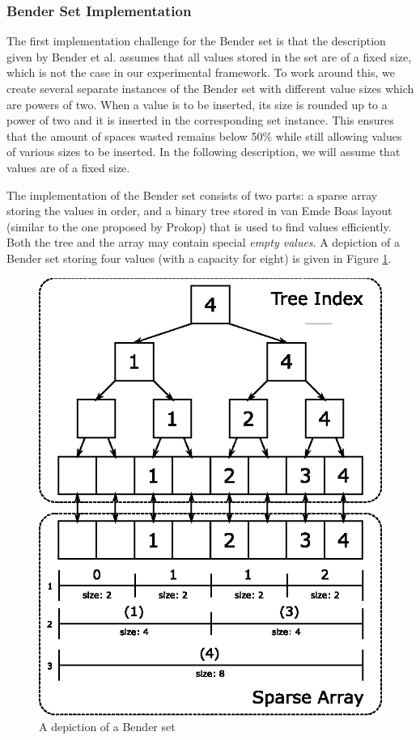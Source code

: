 \documentclass{acm_proc_article-sp}
\begin{document}
\subsubsection{Bender Set Implementation}
The first implementation challenge for the Bender set is that the description
given by Bender et al. assumes that all values stored in the set are of a
fixed size, which is not the case in our experimental framework. To work
around this, we create several separate instances of the Bender set with
different value sizes which are powers of two. When a value is to be inserted,
its size is rounded up to a power of two and it is inserted in the
corresponding set instance. This ensures that the amount of spaces wasted
remains below 50\% while still allowing values of various sizes to be inserted.
In the following description, we will assume that values are of a fixed size.

The implementation of the Bender set consists of two parts: a sparse array
storing the values in order, and a binary tree stored in van Emde Boas
layout (similar to the one proposed by Prokop) that is used to find values
efficiently.
Both the tree and the array may contain special \emph{empty values}.
A depiction of a Bender set storing four values (with a capacity for eight) is
given in Figure \ref{fig-bender-set}.

\begin{figure}
\centering
\includegraphics{bender-set}
\caption{A depiction of a Bender set}\label{fig-bender-set}
\end{figure}
\end{document}
